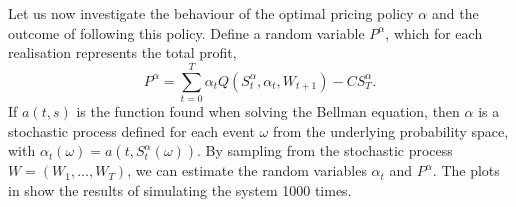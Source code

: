 \documentclass[main.tex]{subfiles}
\begin{document}
Let us now investigate the behaviour of the optimal pricing policy
$\alpha$ and
the outcome of following this policy.
Define a random variable $P^\alpha$, which for each realisation
represents the total profit,
\begin{equation}
  P^\alpha = \sum_{t=0}^T\alpha_tQ(S_t^\alpha,\alpha_t,W_{t+1}) - CS_T^\alpha.
\end{equation}
If $a(t,s)$ is the function found when solving the Bellman equation,
then $\alpha$ is a stochastic process defined for each event $\omega$
from the underlying probability space, with
$\alpha_t(\omega)=a(t,S_t^\alpha(\omega))$.
By sampling from the stochastic process $W=(W_1,\dots,W_T)$, we can
estimate the random variables $\alpha_t$ and $P^\alpha$.
The plots in  show the results of
simulating the system 1000 times.
\end{document}
